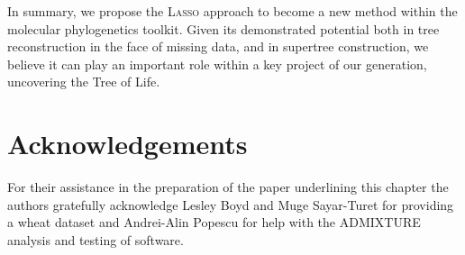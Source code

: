 In summary, we propose the \textsc{Lasso} approach to become a new method
within the molecular phylogenetics toolkit. Given its demonstrated potential
both in tree reconstruction in the face of missing data, and in supertree
construction, we believe it can play an important role within a key project of
our generation, uncovering the Tree of Life.

\section{Acknowledgements}
\label{sec:acknowledgements}

For their assistance in the preparation of the paper underlining this chapter
the authors gratefully acknowledge Lesley Boyd and Muge Sayar-Turet for
providing a wheat dataset and Andrei-Alin Popescu for help with the ADMIXTURE
analysis and testing of software.

